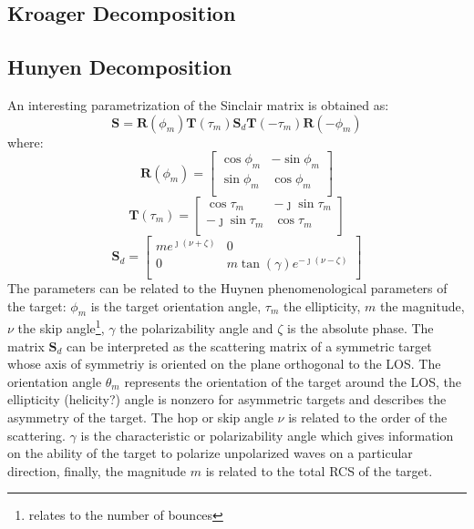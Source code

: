 \documentclass[11pt]{article}
\begin{document}
\subsection{Kroager Decomposition}
\subsection{Hunyen Decomposition}
An interesting parametrization of the Sinclair matrix\cite{huynen1970phenomenological} is obtained as:
\begin{equation}
	\mathbf{S} = \mathbf{R}\left(\phi_m\right) \mathbf{T}\left(\tau_m\right)
		\mathbf{S}_d \mathbf{T}\left(-\tau_m\right) \mathbf{R}\left(-\phi_m\right) 
\end{equation}
where:
\begin{equation}
	\mathbf{R}\left(\phi_m\right) =
	\begin{bmatrix}
		\cos{\phi_m} & -\sin{\phi_m}\\
		\sin{\phi_m} &  \cos{\phi_m}\\
	\end{bmatrix}
\end{equation}
\begin{equation}
	\mathbf{T}\left(\tau_m\right) =
	\begin{bmatrix}
		\cos{\tau_m} & -\jmath\sin{\tau_m}\\
		-\jmath\sin{\tau_m} &  \cos{\tau_m}\\
	\end{bmatrix}
\end{equation}
\begin{equation}
	\mathbf{S}_{d} =
	\begin{bmatrix}
		m e^{\jmath\left(\nu + \zeta\right)} & 0\\
		0 & m \tan\left(\gamma\right)e^{-\jmath\left(\nu - \zeta\right)} \\
	\end{bmatrix}
\end{equation}
The parameters can be related to the Huynen phenomenological parameters of the target: $\phi_m$ is the target orientation angle, $\tau_m$ the ellipticity, $m$ the magnitude, $\nu$ the skip angle\footnote{relates to the number of bounces}, $\gamma$ the polarizability angle and $\zeta$ is the absolute phase.
The matrix $\mathbf{S}_d$ can be interpreted as the scattering matrix of a symmetric target whose axis of symmetriy is oriented on the plane orthogonal to the LOS.
The orientation angle $\theta_m$ represents the orientation of the target around the LOS, the ellipticity (helicity?) angle is nonzero for asymmetric targets and describes the asymmetry of the target. The hop or skip angle $\nu$ is related to the order of the scattering.  $\gamma$ is the characteristic or polarizability angle which gives information on the ability of the target to polarize unpolarized waves on a particular direction, finally, the magnitude $m$ is related to the total RCS of the target.
\end{document}
